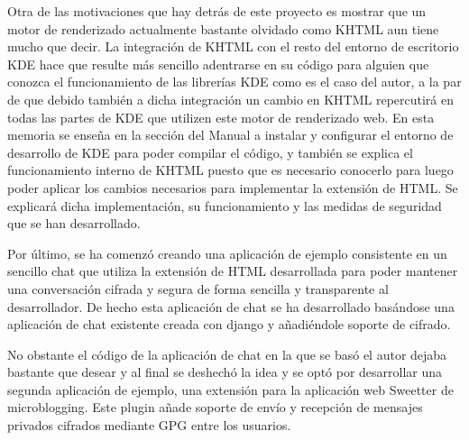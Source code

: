 Otra de las motivaciones que hay detrás de este proyecto es mostrar que un motor de renderizado actualmente bastante olvidado como KHTML aun tiene mucho que decir. La integración de KHTML con el resto del entorno de escritorio KDE hace que resulte más sencillo adentrarse en su código para alguien que conozca el funcionamiento de las librerías KDE como es el caso del autor, a la par de que debido también a dicha integración un cambio en KHTML repercutirá en todas las partes de KDE que utilizen este motor de renderizado web. En esta memoria se enseña en la sección del Manual a instalar y configurar el entorno de desarrollo de KDE para poder compilar el código, y también se explica el funcionamiento interno de KHTML puesto que es necesario conocerlo para luego poder aplicar los cambios necesarios para implementar la extensión de HTML. Se explicará dicha implementación, su funcionamiento y las medidas de seguridad que se han desarrollado.

Por último, se ha comenzó creando una aplicación de ejemplo consistente en un sencillo chat que utiliza la extensión de HTML desarrollada para poder mantener una conversación cifrada y segura de forma sencilla y transparente al desarrollador. De hecho esta aplicación de chat se ha desarrollado basándose una aplicación de chat existente creada con django y añadiéndole soporte de cifrado.

No obstante el código de la aplicación de chat en la que se basó el autor dejaba bastante que desear y al final se deshechó la idea y se optó por desarrollar una segunda aplicación de ejemplo, una extensión para la aplicación web Sweetter de microblogging. Este plugin añade soporte de envío y recepción de mensajes privados cifrados mediante GPG entre los usuarios.